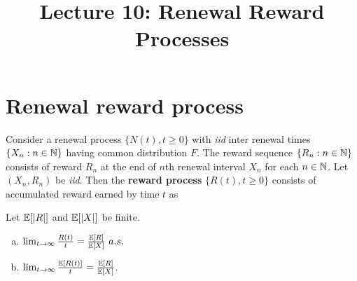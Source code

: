 \documentclass[a4paper,10pt,english]{article}
\title{Lecture 10: Renewal Reward Processes}
\author{}
\begin{document}
\maketitle
\section{Renewal reward process}
Consider a renewal process $\{N(t), t \geq 0\}$ with \textit{iid} inter renewal times $\{X_n: n \in \mathbb{N}\}$ having common distribution $F$.  
The reward sequence $\{R_n: n \in \mathbb{N}\}$ consists of reward $R_n$ at the end of $n$th renewal interval $X_n$ for each $n \in \mathbb{N}$. 
Let $(X_n,R_n)$ be \textit{iid}. 
Then the \textbf{reward process} $\{R(t), t \geqslant 0\}$ consists of accumulated reward earned by time $t$ as 
\begin{thm}
	\label{theorem}
Let $\mathbb{E}[|R|]$ and $\mathbb{E}[|X|]$ be finite.
\begin{enumerate}[(a)]
\item\label{item:Basic} $\lim_{t \to \infty} \frac{R(t)}{t} = \frac{\mathbb{E}[R]}{\mathbb{E}[X]} ~a.s.$
\item\label{item:Elem}  $\lim_{t \to \infty} \frac{\mathbb{E}[R(t)]}{t} = \frac{\mathbb{E}[R]}{\mathbb{E}[X]}$.
\end{enumerate}
\end{thm}
\end{document}
